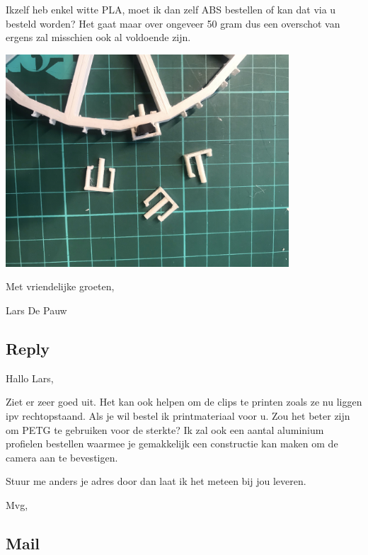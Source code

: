 \documentclass{scrartcl}
\begin{document}
Ikzelf heb enkel witte PLA, moet ik dan zelf ABS bestellen of kan dat via u besteld worden? Het gaat maar over ongeveer 50 gram dus een overschot van ergens zal misschien ook al voldoende zijn.

 

\includegraphics[width=4.166667in, keepaspectratio=true]{./Masterproef_Tool_Wear_Inspection_-_Update_4_DH/voorbeelden van clips op 1cm mat.jpeg}

 

Met vriendelijke groeten,

 

Lars De Pauw



\subsection{Reply}

Hallo Lars,



Ziet er zeer goed uit. Het kan ook helpen om de clips te printen zoals ze nu liggen ipv rechtopstaand. Als je wil bestel ik printmateriaal voor u. Zou het beter zijn om PETG te gebruiken voor de sterkte? Ik zal ook een aantal aluminium profielen bestellen waarmee je gemakkelijk een constructie kan maken om de camera aan te bevestigen.



Stuur me anders je adres door dan laat ik het meteen bij jou leveren.



Mvg,



\subsection{Mail}
\end{document}

